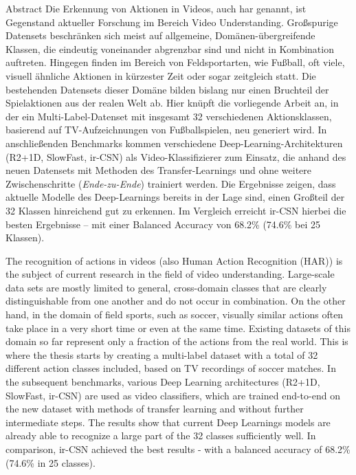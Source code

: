 \newcommand{\primarymetric}{68.2}
\newcommand{\secondarymetric}{74.6}

\begin{prefacesection}{Abstract}
    Die Erkennung von Aktionen in Videos, auch \gls{har} genannt, ist Gegenstand aktueller Forschung im Bereich Video Understanding.
    Großspurige Datensets beschränken sich meist auf allgemeine, Domänen-übergreifende Klassen, die eindeutig voneinander abgrenzbar sind und nicht in Kombination auftreten.
    Hingegen finden im Bereich von Feldsportarten, wie Fußball, oft viele, visuell ähnliche Aktionen in kürzester Zeit oder sogar zeitgleich statt.
    Die bestehenden Datensets dieser Domäne bilden bislang nur einen Bruchteil der Spielaktionen aus der realen Welt ab.
    Hier knüpft die vorliegende Arbeit an, in der ein Multi-Label-Datenset mit insgesamt 32 verschiedenen Aktionsklassen, basierend auf TV-Aufzeichnungen von Fußballspielen, neu generiert wird.
    In anschließenden Benchmarks kommen verschiedene Deep-Learning-Architekturen (R2+1D, SlowFast, ir-CSN) als Video-Klassifizierer zum Einsatz, die anhand des neuen Datensets mit Methoden des Transfer-Learnings und ohne weitere Zwischenschritte (\emph{Ende-zu-Ende}) trainiert werden.
    Die Ergebnisse zeigen, dass aktuelle Modelle des Deep-Learnings bereits in der Lage sind, einen Großteil der 32 Klassen hinreichend gut zu erkennen.
    Im Vergleich erreicht ir-CSN hierbei die besten Ergebnisse -- mit einer Balanced Accuracy von \primarymetric \% (\secondarymetric \% bei 25 Klassen).


    The recognition of actions in videos (also Human Action Recognition (HAR)) is the subject of current research in the field of video understanding.
    Large-scale data sets are mostly limited to general, cross-domain classes that are clearly distinguishable from one another and do not occur in combination.
    On the other hand, in the domain of field sports, such as soccer, visually similar actions often take place in a very short time or even at the same time.
    Existing datasets of this domain so far represent only a fraction of the actions from the real world.
    This is where the thesis starts by creating a multi-label dataset with a total of 32 different action classes included, based on TV recordings of soccer matches.
    In the subsequent benchmarks, various Deep Learning architectures (R2+1D, SlowFast, ir-CSN) are used as video classifiers, which are trained end-to-end on the new dataset with methods of transfer learning and without further intermediate steps.
    The results show that current Deep Learnings models are already able to recognize a large part of the 32 classes sufficiently well.
    In comparison, ir-CSN achieved the best results - with a balanced accuracy of \primarymetric \% (\secondarymetric \% in 25 classes).

\end{prefacesection}